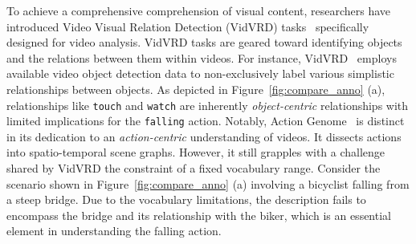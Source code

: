 \documentclass[letterpaper]{article}
\begin{document}
%
To achieve a comprehensive comprehension of visual content, researchers have introduced Video Visual Relation Detection (VidVRD) tasks~\cite{Shang2017VideoVR,shang2019annotating} specifically designed for video analysis. VidVRD tasks are geared toward identifying objects and the relations between them within videos.
%
For instance, VidVRD~\cite{Shang2017VideoVR} employs available video object detection data to non-exclusively label various simplistic relationships between objects. As depicted in Figure~\ref{fig:compare_anno} (a), relationships like \texttt{touch} and \texttt{watch} are inherently \emph{object-centric} relationships with limited implications for the \texttt{falling} action.
Notably, Action Genome~\cite{genome} is distinct in its dedication to an \emph{action-centric} understanding of videos. It dissects actions into spatio-temporal scene graphs. However, it still grapples with a challenge shared by VidVRD  the constraint of a fixed vocabulary range. Consider the scenario shown in Figure~\ref{fig:compare_anno} (a) involving a bicyclist falling from a steep bridge. Due to the vocabulary limitations, the description fails to encompass the bridge and its relationship with the biker, which is an essential element in understanding the falling action.
\end{document}
